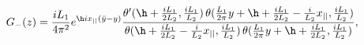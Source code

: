 \begin{equation}\label{szeboe}
G_-(z)=\frac{iL_1}{4\pi^2}
e^{\h ix_{||}(\bar y-y)}
\frac{\theta'(\h+\frac{iL_1}{2L_2},\frac{iL_1}{L_2})\,\theta
(\frac{L_1}{2\pi} 
y +\h+\frac{iL_1}{2L_2}-\frac{i}{L_2}x_{||},\frac{iL_1}{L_2})}{
\theta(\h+\frac{iL_1}{2L_2}-\frac{i}{L_2}x_{||},\frac{iL_1}{L_2})\,
\theta(\frac{L_1}{2\pi} y+\h+\frac{iL_1}{2L_2},\frac{i L_1}{L_2})},
\end{equation}

